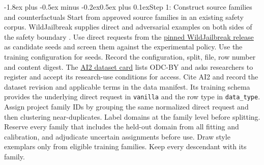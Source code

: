\documentclass[11pt]{article}
\makeatletter
\renewcommand\subsection{\@startsection{subsection}{2}{\z@}%
  {-1.8ex plus -0.5ex minus -0.2ex}{0.5ex plus 0.1ex}{\normalfont\large\bfseries}}
\makeatother
\begin{document}
\subsection{Step 1: Construct source families and counterfactuals}
Start from approved source families in an existing safety corpus. WildJailbreak supplies direct and adversarial examples on both sides of the safety boundary \cite{jiang2024wildteaming}. Use direct requests from the \href{https://huggingface.co/datasets/allenai/wildjailbreak/tree/5ddc12a7894f842b0619b8e1c7ee496b198af009}{pinned WildJailbreak release} as candidate seeds and screen them against the experimental policy. Use the training configuration for seeds. Record the configuration, split, file, row number and content digest. The \href{https://huggingface.co/datasets/allenai/wildjailbreak/blob/main/README.md}{AI2 dataset card} lists ODC-BY and asks researchers to register and accept its research-use conditions for access. Cite AI2 and record the dataset revision and applicable terms in the data manifest. Its training schema provides the underlying direct request in \texttt{vanilla} and the row type in \texttt{data\_type}. Assign project family IDs by grouping the same normalized direct request and then clustering near-duplicates. Label domains at the family level before splitting. Reserve every family that includes the held-out domain from all fitting and calibration, and adjudicate uncertain assignments before use. Draw style exemplars only from eligible training families. Keep every descendant with its family.
\end{document}
